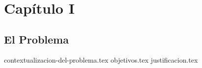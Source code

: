\chapter{Capítulo I}
\section{El Problema}
{contextualizacion-del-problema.tex}
{objetivos.tex}
{justificacion.tex}
